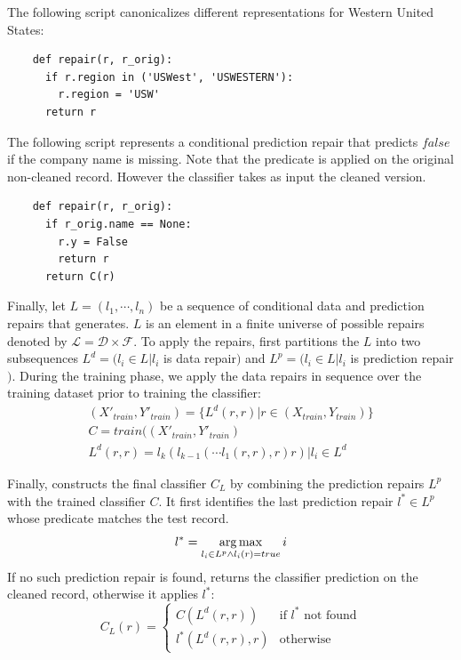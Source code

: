 \begin{example}\sloppy
The following script canonicalizes different representations for Western United States:
{\small\begin{verbatim}
    def repair(r, r_orig):
      if r.region in ('USWest', 'USWESTERN'):
        r.region = 'USW'
      return r
\end{verbatim}}
\end{example}

\vspace{0.25em}
\begin{example}\sloppy
The following script represents a conditional prediction repair that predicts $false$ if the company name is missing.  Note that the predicate is applied on the original non-cleaned record. However the classifier takes as input the cleaned version.
{\small\begin{verbatim}
    def repair(r, r_orig):
      if r_orig.name == None:
        r.y = False
        return r
      return C(r)
\end{verbatim}}
\end{example}

\noindent Finally, let $L = (l_1,\cdots,l_n)$ be a sequence of conditional data and prediction repairs that \sys generates. 
$L$ is an element in a finite universe of possible repairs denoted by $\mathcal{L}=\mathcal{D}\times\mathcal{F}$.
To apply the repairs, \sys first partitions the $L$ into two subsequences $L^d = (l_i \in L | l_i$ is data repair$)$ and $L^p = (l_i \in L | l_i$ is prediction repair$)$.  During the training phase, we apply the data repairs in sequence over the training dataset prior to training the classifier:
\begin{align}
(X'_{train}, Y'_{train}) = \{L^d(r, r) | r \in (X_{train}, Y_{train}) \}\\
C = train((X'_{train}, Y'_{train})\\
L^d(r, r) = l_k(l_{k-1}(\cdots l_1(r, r), r) r) | l_i \in L^d
\end{align}

Finally, \sys constructs the final classifier $C_{L}$ by combining the prediction repairs $L^p$ with the trained classifier $C$.  It first identifies the last prediction repair $l^* \in L^p$ whose predicate matches the test record.  
$$l^* = \operatorname*{arg\,max}_{l_i \in L^p \wedge l_i(r) = true} i$$
If no such prediction repair is found, \sys  returns the classifier prediction on the cleaned record, otherwise it applies $l^*$:
$$C_{L}(r) = \begin{cases}
    C(L^d(r, r))& \text{if } l^*\textrm{\ not\ found}\\
    l^*(L^d(r, r), r) & \text{otherwise}
\end{cases}$$

